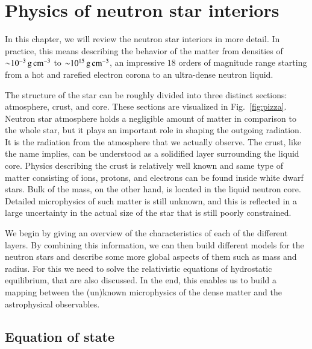 \chapter{Physics of neutron star interiors} 

\noindent
In this chapter, we will review the neutron star interiors in more detail.
In practice, this means describing the behavior of the matter from densities of $\mathord{\sim} 10^{-3} \, \mathrm{g}\,\mathrm{cm}^{-3}$ to $\mathord{\sim} 10^{15} \, \mathrm{g}\,\mathrm{cm}^{-3}$, an impressive $18$ orders of magnitude range starting from a hot and rarefied electron corona to an ultra-dense neutron liquid.

The structure of the star can be roughly divided into three distinct sections: atmosphere, crust, and core.
These sections are visualized in Fig.~\ref{fig:pizza}.
Neutron star atmosphere holds a negligible amount of matter in comparison to the whole star, but it plays an important role in shaping the outgoing radiation.
It is the radiation from the atmosphere that we actually observe.
The crust, like the name implies, can be understood as a solidified layer surrounding the liquid core.
Physics describing the crust is relatively well known and same type of matter consisting of ions, protons, and electrons can be found inside white dwarf stars.
Bulk of the mass, on the other hand, is located in the liquid neutron core.
Detailed microphysics of such matter is still unknown, and this is reflected in a large uncertainty in the actual size of the star that is still poorly constrained.

We begin by giving an overview of the characteristics of each of the different layers.
By combining this information, we can then build different models for the neutron stars and describe some more global aspects of them such as mass and radius.
For this we need to solve the relativistic equations of hydrostatic equilibrium, that are also discussed.
In the end, this enables us to build a mapping between the (un)known microphysics of the dense matter and the astrophysical observables.


\section{Equation of state}
%
%
%
%

